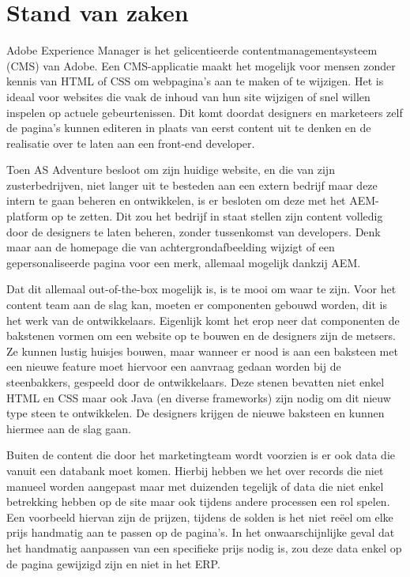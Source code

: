 \section{Stand van zaken}
\label{sec:onderzoeksvragen}
	Adobe Experience Manager is het gelicentieerde  contentmanagementsysteem (CMS) van Adobe. 
	Een CMS-applicatie maakt het mogelijk voor mensen zonder kennis van HTML of CSS om webpagina’s aan te maken of te wijzigen. 
	Het is ideaal voor websites die vaak de inhoud van hun site wijzigen of snel willen inspelen op actuele gebeurtenissen. 
	Dit komt doordat designers en marketeers zelf de pagina's kunnen editeren in plaats van eerst content uit te denken en de realisatie over te laten aan een front-end developer. 
	\par
	Toen AS Adventure besloot om zijn huidige website, en die van zijn zusterbedrijven, niet langer uit te besteden aan een extern bedrijf maar deze intern te gaan beheren en ontwikkelen, is er besloten om deze met het AEM-platform op te zetten. 
	Dit zou het bedrijf in staat stellen zijn content volledig door de designers te laten beheren, zonder tussenkomst van developers.
	Denk maar aan de homepage die van achtergrondafbeelding wijzigt of een gepersonaliseerde pagina voor een merk, allemaal mogelijk dankzij AEM.
	\par
	Dat dit allemaal out-of-the-box mogelijk is, is te mooi om waar te zijn. Voor het content team aan de slag kan, moeten er componenten gebouwd worden, dit is het werk van de ontwikkelaars. Eigenlijk komt het erop neer dat componenten de bakstenen vormen om een website op te bouwen en de designers zijn de metsers. Ze kunnen lustig huisjes bouwen, maar wanneer er nood is aan een baksteen met een nieuwe feature moet hiervoor een aanvraag gedaan worden bij de steenbakkers, gespeeld door de ontwikkelaars. Deze stenen bevatten niet enkel HTML en CSS maar ook Java (en diverse frameworks) zijn nodig om dit nieuw type steen te ontwikkelen. De designers krijgen de nieuwe baksteen en kunnen hiermee aan de slag gaan.
	\par
	Buiten de content die door het marketingteam wordt voorzien is er ook data die vanuit een databank moet komen. 
	Hierbij hebben we het over records die niet manueel worden aangepast maar met duizenden tegelijk of data die niet enkel betrekking hebben op de site maar ook tijdens andere processen een rol spelen. 
	Een voorbeeld hiervan zijn de prijzen, tijdens de solden is het niet re\"eel om elke prijs handmatig aan te passen op de pagina’s. 
	In het onwaarschijnlijke geval dat het handmatig aanpassen van een specifieke prijs nodig is, zou deze data enkel op de pagina gewijzigd zijn en niet in het ERP. 
